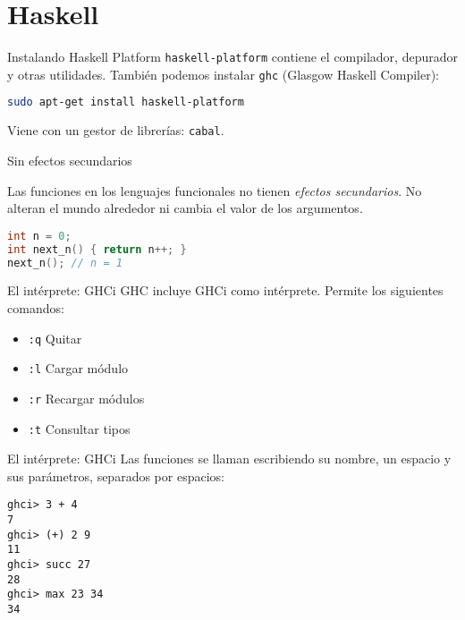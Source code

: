 \section{Haskell}

\begin{frame}[fragile]{Instalando Haskell Platform}
  \texttt{haskell-platform} contiene el compilador, depurador y otras utilidades.
  También podemos instalar \texttt{ghc} (Glasgow Haskell Compiler):
  \espacio
  \begin{lstlisting}[language=bash]
sudo apt-get install haskell-platform
  \end{lstlisting}
  \espacio
  Viene con un gestor de librerías: \texttt{cabal}.
\end{frame}

\begin{frame}[fragile]{Sin efectos secundarios}

    Las funciones en los lenguajes funcionales no tienen \textit{efectos secundarios}.
    No alteran el mundo alrededor ni cambia el valor de los argumentos.
    \espacio
  \begin{lstlisting}[language=C++]
int n = 0;
int next_n() { return n++; }
next_n(); // n = 1
  \end{lstlisting}

\end{frame}

\begin{frame}{El intérprete: GHCi}
  GHC incluye GHCi como intérprete. Permite los siguientes comandos:
  \espacio
  \begin{itemize}
    \item \texttt{:q} \qquad  Quitar
    \item \texttt{:l} \qquad  Cargar módulo
    \item \texttt{:r} \qquad  Recargar módulos
    \item \texttt{:t} \qquad  Consultar tipos
  \end{itemize}

\end{frame}

\begin{frame}[fragile]{El intérprete: GHCi}
 Las funciones se llaman escribiendo su nombre, un espacio y sus parámetros, separados por espacios:
\espacio
  \begin{lstlisting}
ghci> 3 + 4
7
ghci> (+) 2 9
11
ghci> succ 27
28
ghci> max 23 34
34
  \end{lstlisting}

\end{frame}
